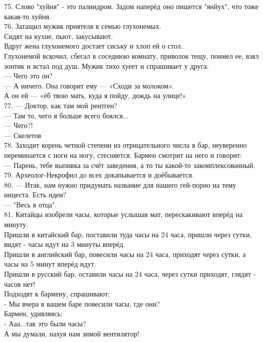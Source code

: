 \documentclass[a4paper,20pt,notitlepage]{extbook}
\begin{document}
	75. Слово "хуйня" - это палиндром.
	Задом наперёд оно пишется "янйух", что тоже какая-то хуйня.\\
	
	76. Затащил мужик приятеля в семью глухонемых. \\
	Сидят на кухне, пьют, закусывают. \\
	Вдруг жена глухонемого достает сиську и хлоп ей о стол.\\
	Глухонемой вскочил, сбегал в соседнюю комнату, приволок тещу, поимел ее, взял зонтик и встал под душ. 
	Мужик тихо хуеет и спрашивает у друга:\\
	— Чего это он?\\
	— А ничего. Она говорит ему — «Сходи за молоком». \\
	А он ей — «ёб твою мать, куда я пойду, дождь на улице!»\\
	
	77. — Доктор, как там мой рентген? \\
	— Там то, чего я больше всего боялся...\\
	— Чего?!\\
	— Скелетов\\
	
	78. Заходит корень четной степени из отрицательного числа в бар, 
	неуверенно переминается с ноги на ногу, стесняется.
	Бармен смотрит на него и говорит: \\
	— Парень, тебе выпивка за счёт заведения, а то ты какой-то закомплексованный.\\
	
	79. Археолог-Некрофил до всех докапывается и доёбывается.\\
	
	80. — Итак, нам нужно придумать название для нашего гей-порно на тему инцеста. Есть идеи?\\
	— "Весь в отца".\\
	
	81. Китайцы изобрели часы, которые услышав мат, перескакивают вперёд на минуту.\\
	Пришли в китайский бар, поставили туда часы на 24 часа, пришли через сутки, видят - часы идут на 3 минуты вперёд.\\
	Пришли в английский бар, повесили часы на 24 часа, приходят через сутки, а часы на 5 минут вперёд идут.\\
	Пришли в русский бар, оставили часы на 24 часа, через сутки приходят, глядят - часов нет!\\
	Подходят к бармену, спрашивают:\\
	- Мы вчера в вашем баре повесили часы, где они?\\
	Бармен, удивляясь:\\
	- Ааа...так это были часы? \\
	А мы думали, нахуя нам зимой вентилятор!\\
	
\end{document}
